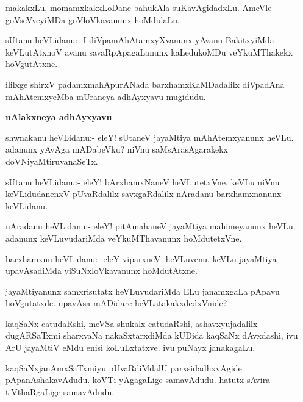 \begin{mng}
makakxLu, momamxkakxLoDane bahukAla suKavAgidadxLu. AmeVle goVseVveyiMDa goVloVkavanunx hoMdidaLu.
\end{mng}

\begin{mng}
sUtanu heVLidanu:- I diVpamAhAtamxyXvanunx yAvanu BakitxyiMda keVLutAtxnoV avanu savaRpApagaLanunx kaLedukoMDu veYkuMThakekx hoVgutAtxne.
\end{mng}
ililxge shirxV padamxmahApurANada barxhamxKaMDadalilx diVpadAna mAhAtemxyeMba mUraneya adhAyxyavu mugidudu.

\begin{center}
\textbf{\Large nAlakxneya adhAyxyavu}
\end{center}

\begin{mng}
shwnakanu heVLidanu:- eleY! sUtaneV jayaMtiya mAhAtemxyanunx heVLu. adanunx yAvAga mADabeVku? niVnu saMsArasAgarakekx doVNiyaMtiruvanaSeTx.
\end{mng}

\begin{mng}
sUtanu heVLidanu:- eleY! bArxhamxNaneV heVLutetxVne, keVLu niVnu keVLidudanenxV pUvaRdalilx savxgaRdalilx nAradanu barxhamxnanunx keVLidanu.
\end{mng}

\begin{mng}
nAradanu heVLidanu:- eleY! pitAmahaneV jayaMtiya mahimeyanunx heVLu. adanunx keVLuvudariMda veYkuMThavanunx hoMdutetxVne.
\end{mng}

\begin{mng}
barxhamxnu heVLidanu:- eleY viparxneV, heVLuvenu, keVLu jayaMtiya upavAsadiMda viSuNxloVkavanunx hoMdutAtxne.
\end{mng}

\begin{mng}
jayaMtiyanunx samxrisutatx heVLuvudariMda ELu janamxgaLa pApavu hoVgutatxde. upavAsa mADidare heVLatakakxdedxVnide?
\end{mng}

\begin{mng}
kaqSaNx catudaRshi, meVSa shukalx catudaRshi, ashavxyujadalilx dugARSaTxmi sharxvaNa nakaSxtarxdiMda kUDida kaqSaNx dAvxdashi, ivu ArU jayaMtiV eMdu enisi koLuLxtatxve. ivu puNayx janakagaLu.
\end{mng}

\begin{mng}
kaqSaNxjanAmxSaTxmiyu pUvaRdiMdalU parxsidadhxvAgide. pApanAshakavAdudu. koVTi yAgagaLige samavAdudu. hatutx sAvira tiVthaRgaLige samavAdudu.
\end{mng}

